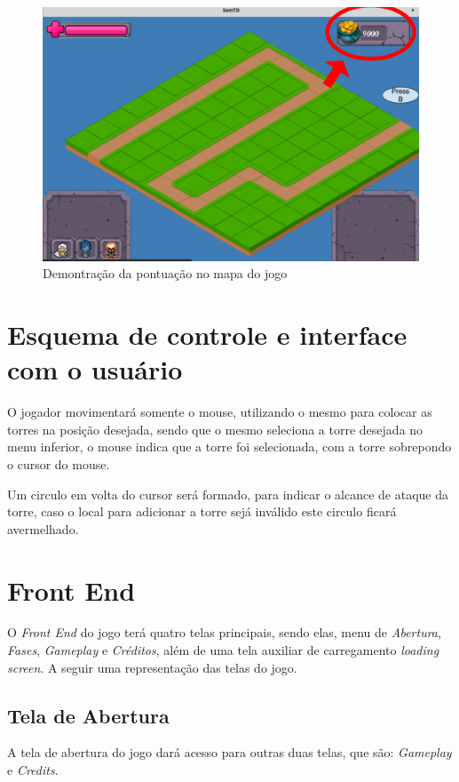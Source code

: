 \documentclass[11pt]{article} %
\begin{document}
\begin{figure}[!htp]
\centering
\includegraphics[scale=0.3]{res/pontuacao.png}
\caption{Demontração da pontuação no mapa do jogo}
\label{pontuacao}
\end{figure}
 

\section{Esquema de controle e interface com o usuário}

O jogador movimentará somente o mouse, utilizando o mesmo para colocar as torres na posição desejada, sendo que o mesmo seleciona a torre desejada no menu inferior, o mouse indica que a torre foi selecionada, com a torre sobrepondo o cursor do mouse.

Um circulo em volta do cursor será formado, para indicar o alcance de ataque da torre, caso o local para adicionar a torre sejá inválido este circulo ficará avermelhado.  

\newpage

\section{Front End}

O \textit{Front End} do jogo terá  quatro telas principais, sendo elas, menu de \textit{Abertura}, \textit{Fases}, \textit{Gameplay} e \textit{Créditos}, além de uma tela auxiliar de carregamento \textit{loading screen}. A seguir uma representação das telas do jogo.

\subsection{Tela de Abertura}
A tela de abertura do jogo dará acesso para outras duas telas, que são: \textit{Gameplay} e \textit{Credits}.
\end{document}
